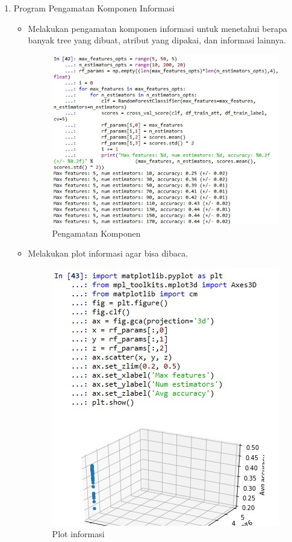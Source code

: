 \begin{enumerate}
\item Program Pengamatan Komponen Informasi
	\begin{itemize}
		\item Melakukan pengamatan komponen informasi untuk menetahui berapa banyak tree yang dibuat, atribut yang dipakai, dan informasi lainnya.
			\begin{figure}[ht]
			\centering
			\includegraphics[scale=0.5]{figures/AFS/sunandhar1.jpg}
			\caption{Pengamatan Komponen}
			\label{contoh}
			\end{figure}
		\item Melakukan plot informasi agar bisa dibaca.
			\begin{figure}[ht]
			\centering
			\includegraphics[scale=0.5]{figures/AFS/sunandhar2.jpg}
			\caption{Plot informasi}
			\label{contoh}
			\end{figure}
	\end{itemize}
\end{enumerate}

